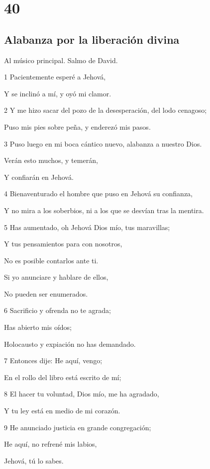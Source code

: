 \chapter{40}

\section*{Alabanza por la liberación divina}

\par Al músico principal. Salmo de David.

\par 1 Pacientemente esperé a Jehová,
\par Y se inclinó a mí, y oyó mi clamor.
\par 2 Y me hizo sacar del pozo de la desesperación, del lodo cenagoso;
\par Puso mis pies sobre peña, y enderezó mis pasos.
\par 3 Puso luego en mi boca cántico nuevo, alabanza a nuestro Dios.
\par Verán esto muchos, y temerán,
\par Y confiarán en Jehová.
\par 4 Bienaventurado el hombre que puso en Jehová su confianza,
\par Y no mira a los soberbios, ni a los que se desvían tras la mentira.
\par 5 Has aumentado, oh Jehová Dios mío, tus maravillas;
\par Y tus pensamientos para con nosotros,
\par No es posible contarlos ante ti.
\par Si yo anunciare y hablare de ellos,
\par No pueden ser enumerados.
\par 6 Sacrificio y ofrenda no te agrada;
\par Has abierto mis oídos;
\par Holocausto y expiación no has demandado.
\par 7 Entonces dije: He aquí, vengo;
\par En el rollo del libro está escrito de mí;
\par 8 El hacer tu voluntad, Dios mío, me ha agradado,
\par Y tu ley está en medio de mi corazón.
\par 9 He anunciado justicia en grande congregación;
\par He aquí, no refrené mis labios,
\par Jehová, tú lo sabes.
